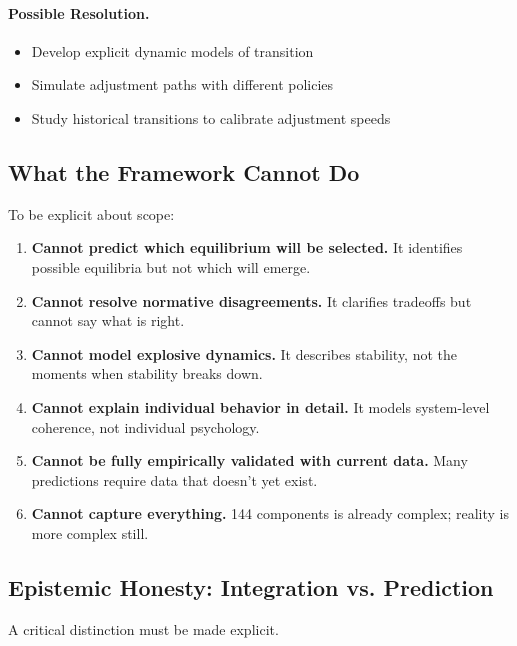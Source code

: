 \documentclass[12pt,a4paper]{article}
\begin{document}
\paragraph{Possible Resolution.}
\begin{itemize}
  \item Develop explicit dynamic models of transition
  \item Simulate adjustment paths with different policies
  \item Study historical transitions to calibrate adjustment speeds
\end{itemize}

\subsection{What the Framework Cannot Do}

To be explicit about scope:

\begin{enumerate}
  \item \textbf{Cannot predict which equilibrium will be selected.}
        It identifies possible equilibria but not which will emerge.
  
  \item \textbf{Cannot resolve normative disagreements.}
        It clarifies tradeoffs but cannot say what is right.
  
  \item \textbf{Cannot model explosive dynamics.}
        It describes stability, not the moments when stability breaks down.
  
  \item \textbf{Cannot explain individual behavior in detail.}
        It models system-level coherence, not individual psychology.
  
  \item \textbf{Cannot be fully empirically validated with current data.}
        Many predictions require data that doesn't yet exist.
  
  \item \textbf{Cannot capture everything.}
        144 components is already complex; reality is more complex still.
\end{enumerate}

\subsection{Epistemic Honesty: Integration vs. Prediction}

A critical distinction must be made explicit.
\end{document}
